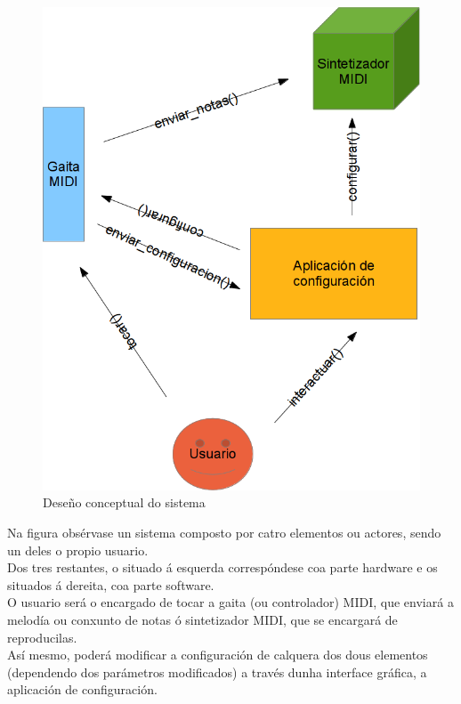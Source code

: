  \begin{figure}[htbp]
  \centering
  \includegraphics[scale=0.6,keepaspectratio=true]{./imagenes/concepto-operacion.png}
  \caption{Deseño conceptual do sistema}
  \label{figura:DesenoConceptual}
 \end{figure}

 Na figura obsérvase un sistema composto por catro elementos ou actores, sendo
 un deles o propio usuario. \\

 Dos tres restantes, o situado á esquerda correspóndese coa parte hardware e os
 situados á dereita, coa parte software. \\

 O usuario será o encargado de tocar a gaita (ou controlador) MIDI, que enviará
 a melodía ou conxunto de notas ó sintetizador MIDI, que se encargará de
 reproducilas. \\

 Así mesmo, poderá modificar a configuración de calquera dos dous elementos
 (dependendo dos parámetros modificados) a través dunha interface gráfica, a
 aplicación de configuración. \\

